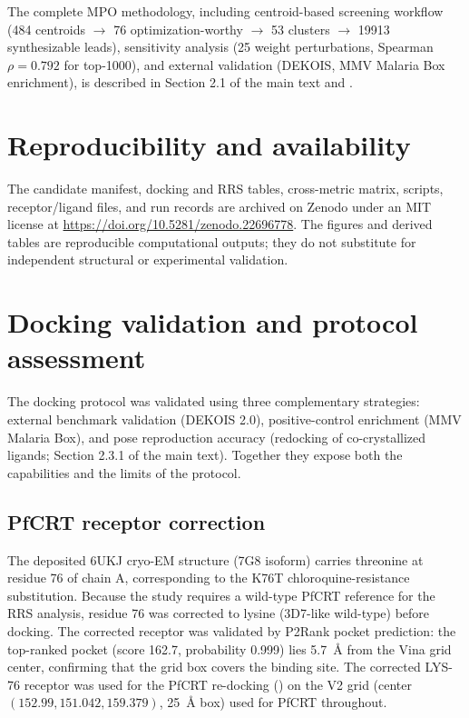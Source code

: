 \documentclass[11pt,a4paper]{article}
\begin{document}
	The complete MPO methodology, including centroid-based screening workflow (\num{484} centroids $\rightarrow$ \num{76} optimization-worthy $\rightarrow$ \num{53} clusters $\rightarrow$ \num{19913} synthesizable leads), sensitivity analysis (\num{25} weight perturbations, Spearman $\rho = \num{0.792}$ for top-1000), and external validation (DEKOIS, MMV Malaria Box enrichment), is described in Section 2.1 of the main text and .
	
	\section{Reproducibility and availability}\label{sec:sm_repro}
	The candidate manifest, docking and RRS tables, cross-metric matrix, scripts, receptor/ligand files, and run records are archived on Zenodo under an MIT license at \url{https://doi.org/10.5281/zenodo.22696778}. The figures and derived tables are reproducible computational outputs; they do not substitute for independent structural or experimental validation.
	
	\section{Docking validation and protocol assessment}\label{sec:sm_validation}
	The docking protocol was validated using three complementary strategies: external benchmark validation (DEKOIS 2.0), positive-control enrichment (MMV Malaria Box), and pose reproduction accuracy (redocking of co-crystallized ligands; Section 2.3.1 of the main text). Together they expose both the capabilities and the limits of the protocol.
	
	\subsection{PfCRT receptor correction}\label{sec:sm_val_crt}
	The deposited 6UKJ cryo-EM structure (7G8 isoform) carries threonine at residue 76 of chain A, corresponding to the K76T chloroquine-resistance substitution. Because the study requires a wild-type PfCRT reference for the RRS analysis, residue 76 was corrected to lysine (3D7-like wild-type) before docking. The corrected receptor was validated by P2Rank pocket prediction: the top-ranked pocket (score 162.7, probability 0.999) lies \qty{5.7}{\angstrom} from the Vina grid center, confirming that the grid box covers the binding site. The corrected LYS-76 receptor was used for the PfCRT re-docking () on the V2 grid (center $(\num{152.99}, \num{151.042}, \num{159.379})$, \qty{25}{\angstrom} box) used for PfCRT throughout.
	
\end{document}
